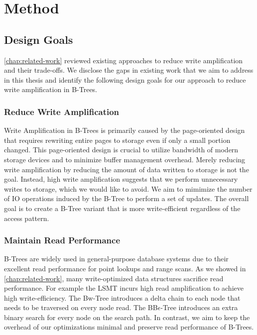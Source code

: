 \chapter{Method}
\label{chap:method}

\section{Design Goals}
\autoref{chap:related-work} reviewed existing approaches to reduce write amplification and their trade-offs.
We disclose the gaps in existing work that we aim to address in this thesis and identify the following design goals for our approach to reduce write amplification in B-Trees.

\subsection*{Reduce Write Amplification}
Write Amplification in B-Trees is primarily caused by the page-oriented design that requires rewriting entire pages to storage even if only a small portion changed.
This page-oriented design is crucial to utilize bandwidth of modern storage devices and to minimize buffer management overhead.
Merely reducing write amplification by reducing the amount of data written to storage is not the goal.
Instead, high write amplification suggests that we perform unnecessary writes to storage, which we would like to avoid.
We aim to mimimize the number of \ac{IO} operations induced by the B-Tree to perform a set of updates.
The overall goal is to create a B-Tree variant that is more write-efficient regardless of the access pattern.

\subsection*{Maintain Read Performance}
B-Trees are widely used in general-purpose database systems due to their excellent read performance for point lookups and range scans.
As we showed in \autoref{chap:related-work}, many write-optimized data structures sacrifice read performance.
For example the \ac{LSMT} incurs high read amplification to achieve high write-efficiency. 
The Bw-Tree introduces a delta chain to each node that needs to be traversed on every node read.
The BB$\epsilon$-Tree introduces an extra binary search for every node on the search path.
In contrast, we aim to keep the overhead of our optimizations minimal and preserve read performance of B-Trees.

